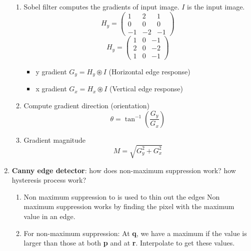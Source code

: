\documentclass[12pt,letterpaper]{article}
\begin{document}
\begin{enumerate}
    \color{red}
    \begin{enumerate}
        \item Sobel filter computes the gradients of input image. $I$ is the input image. 
        $$ H_y  =
    \begin{pmatrix}
    1 & 2 & 1\\
    0 & 0 & 0\\
    -1 & - 2 & -1 
    \end{pmatrix}$$
    $$ H_y  =
    \begin{pmatrix}
    1 & 0 & -1\\
    2 & 0 & -2\\
    1 & 0 & -1 
    \end{pmatrix}$$
        \begin{itemize}
            \item y gradient $G_y = H_y \circledast I$ (Horizontal edge response)
            \item x gradient $G_x = H_x \circledast I$ (Vertical edge response)
        \end{itemize}
        \item Compute gradient direction (orientation)
        $$\theta = \tan^{-1}(\frac{G_y}{G_x})$$
        \item Gradient magnitude 
        $$M = \sqrt{G_y^2 + G_x^2}$$
    \end{enumerate}
    \color{black}
    \item \textbf{Canny edge detector}: how does non-maximum suppression work? how hysteresis process work?\\
    \color{red}
    \begin{enumerate}
        \item Non maximum suppression to is used to thin out the edges Non maximum suppression works by finding the pixel with the maximum value in an edge.
        \item For non-maximum suppression: At \textbf{q}, we have a maximum if the value is larger than those at both \textbf{p} and at \textbf{r}. Interpolate to get these values.

\end{enumerate}
\end{enumerate}
\end{document}
